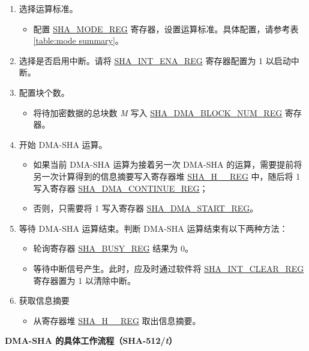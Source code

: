\documentclass[main\_\_CN.tex]{subfiles}
\begin{document}
\begin{enumerate}
    \item 选择运算标准。
    \begin{itemize}
        \item 配置 \hyperref[regdesc:SHAMODEREG]{SHA\_MODE\_REG} 寄存器，设置运算标准。具体配置，请参考表 \ref{table:mode summary}。
    \end{itemize}
    \item 选择是否启用中断。请将 \hyperref[regdesc:SHAINTENAREG]{SHA\_INT\_ENA\_REG} 寄存器配置为 1 以启动中断。
    \item 配置块个数。
    \begin{itemize}
        \item  将待加密数据的总块数 {\it{M}} 写入  \hyperref[regdesc:SHADMABLOCKNUMREG]{SHA\_DMA\_BLOCK\_NUM\_REG} 寄存器。
    \end{itemize}
    \item 开始 DMA-SHA 运算。
        \begin{itemize}
            \item 如果当前 DMA-SHA 运算为接着另一次 DMA-SHA 的运算，需要提前将另一次计算得到的信息摘要写入寄存器堆 \hyperref[regdesc:SHAHNREG]{SHA\_H\_\_REG} 中，随后将 1 写入寄存器 \hyperref[regdesc:SHADMACONTINUEREG]{SHA\_DMA\_CONTINUE\_REG}；
            \item 否则，只需要将 1 写入寄存器 \hyperref[regdesc:SHADMASTARTREG]{SHA\_DMA\_START\_REG}。
        \end{itemize}
    \item 等待 DMA-SHA 运算结束。判断 DMA-SHA 运算结束有以下两种方法：
        \begin{itemize}
            \item 轮询寄存器 \hyperref[regdesc:SHABUSYREG]{SHA\_BUSY\_REG} 结果为 0。
            \item 等待中断信号产生。此时，应及时通过软件将 \hyperref[regdesc:SHAINTCLEARREG]{SHA\_INT\_CLEAR\_REG} 寄存器置为 1 以清除中断。
        \end{itemize}

    \item 获取信息摘要
    \begin{itemize}
        \item 从寄存器堆 \hyperref[regdesc:SHAHNREG]{SHA\_H\_\_REG} 取出信息摘要。
    \end{itemize}

\end{enumerate}

\textbf{DMA-SHA 的具体工作流程（SHA-512/{\it{t}}）}
\end{document}
